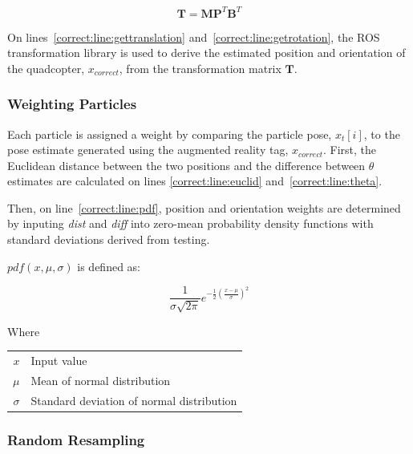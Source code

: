 			\[\textbf{T} = \textbf{M}\textbf{P}^T\textbf{B}^T \]

			On lines~\ref{correct:line:gettranslation} and~\ref{correct:line:getrotation}, the ROS transformation library is used to derive the estimated position and orientation of the quadcopter, $x_{correct}$, from the transformation matrix $\textbf{T}$.

		\subsubsection{Weighting Particles}
			Each particle is assigned a weight by comparing the particle pose, $x_t[i]$, to the pose estimate generated using the augmented reality tag, $x_{correct}$. First, the Euclidean distance between the two positions and the difference between $\theta$ estimates are calculated on lines \ref{correct:line:euclid} and~\ref{correct:line:theta}.

			Then, on line~\ref{correct:line:pdf}, position and orientation weights are determined by inputing \textit{dist} and \textit{diff} into zero-mean probability density functions with standard deviations derived from testing.

			$pdf(x, \mu, \sigma)$ is defined as:

			\[ \frac{1}{\sigma\sqrt{2\pi}}e^{-\frac{1}{2}(\frac{x-\mu}{\sigma})^2} \]
			
			Where

			\begin{table}[H]
				\centering
			\begin{tabular}{@{}r@{$\quad$\,}l}
				$x$ & Input value\\
				$\mu$ & Mean of normal distribution\\
				$\sigma$ & Standard deviation of normal distribution
			\end{tabular}
			\end{table}

		 
		\subsubsection{Random Resampling}

